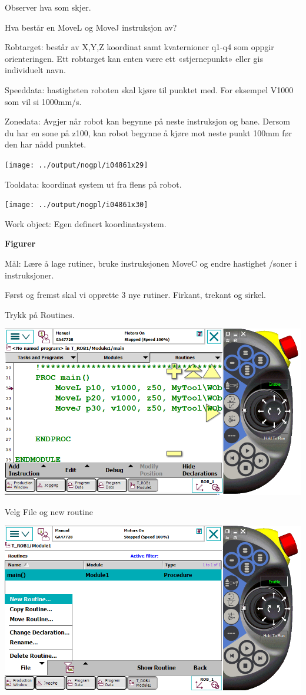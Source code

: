 Observer hva som skjer.

Hva består en MoveL og MoveJ instruksjon av? 

Robtarget: består av X,Y,Z koordinat samt kvaternioner q1-q4 som oppgir
orienteringen. Ett robtarget kan enten være ett «stjernepunkt» eller
gis individuelt navn. 

Speeddata: hastigheten roboten skal kjøre til punktet med. For eksempel
V1000 som vil si 1000mm/s. 

Zonedata: Avgjer når robot kan begynne på neste instruksjon og bane.
Dersom du har en sone på z100, kan robot begynne å kjøre mot neste
punkt 100mm før den har nådd punktet. 

\texttt{[image: ../output/nogpl/i04861x29]}

Tooldata: koordinat system ut fra flens på robot.

\texttt{[image: ../output/nogpl/i04861x30]}

Work object: Egen definert koordinatsystem.

\textbf{Figurer}

Mål: Lære å lage rutiner, bruke instruksjonen MoveC og endre hastighet
/soner i instruksjoner. 

Først og fremst skal vi opprette 3 nye rutiner. Firkant, trekant og
sirkel. 

Trykk på Routines. 

\includegraphics[width=1\textwidth]{i04861x31}

Velg File og new routine 

\includegraphics[width=1\textwidth]{i04861x32}

